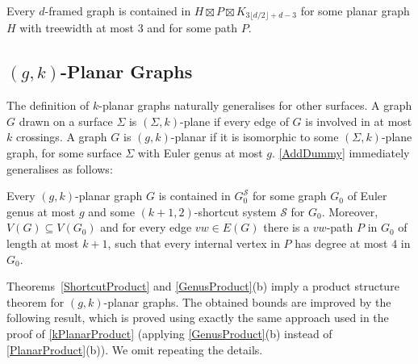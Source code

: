 \documentclass{patmorin}
\newcommand{\note}[2]{\noindent{\color{red}[#1:~#2]}}
\renewcommand{\SS}{\mathcal{S}}
\begin{document}
\begin{thm}
\label{framed}
   Every $d$-framed graph is contained in $H\boxtimes P\boxtimes K_{3\lfloor d/2\rfloor + d -3}$ for some planar graph $H$ with treewidth at most 3 and for some path $P$.
\end{thm}

\note{DW}{I think \cref{framed} should be proved explicitly and \cref{1-planar} should be a corollary, especially because \cref{NewMapGraph} is another corollary. The proof of \cref{framed} needs an extra clause; see the last sentence of \cref{NewLemma}. This section should be about framed graphs, outside of \cref{sec-k-planar}. I suggest we make it a subsection of \cref{Structure} where we introduce framed graphs, say they can be described by $(2,\binom{d}{2})$-shortcut systems, so the main theorem is applicable, which gives a treewidth bound of $\binom{5}{3}-1=9$, but using  \cref{framed} we get a treewidth bound of 3, which is optional. Then in latter sections we give two applications, for 1-planar graphs and for $d$-map graphs. }

\subsection{\boldmath $(g,k)$-Planar Graphs}

The definition of $k$-planar graphs naturally generalises for other surfaces. A graph $G$ drawn on a surface $\Sigma$ is $(\Sigma,k)$-plane if every edge of $G$ is involved in at most $k$ crossings.  A graph $G$ is $(g,k)$-planar if it is isomorphic to some $(\Sigma,k)$-plane graph, for some surface $\Sigma$ with Euler genus at most $g$. \cref{AddDummy} immediately generalises as follows:

\begin{obs}
\label{gAddDummy}
Every $(g,k)$-planar graph $G$ is contained in $G_0^\SS$ for some graph $G_0$ of Euler genus at most $g$ and some $(k+1,2)$-shortcut system $\SS$ for $G_0$. Moreover, $V(G) \subseteq V(G_0)$ and for every edge $vw \in E(G)$ there is a $vw$-path $P$ in $G_0$ of length at most $k+1$, such that every internal vertex in $P$ has degree at most $4$ in $G_0$.
\end{obs}

Theorems~\ref{ShortcutProduct}  and \ref{GenusProduct}(b) imply a product structure theorem for $(g,k)$-planar graphs. The obtained bounds are improved by the following result, which is proved using exactly the same approach used in the proof of \cref{kPlanarProduct} (applying \cref{GenusProduct}(b) instead of \cref{PlanarProduct}(b)). We omit repeating the details.
\end{document}
